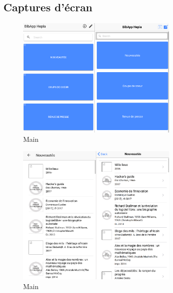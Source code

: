 \documentclass[a4paper, 12pt]{article}
\begin{document}
\subsection{Captures d'écran}
\begin{figure}
    \begin{center}
        \includegraphics[width=0.7\textwidth]{images/screenshots/android_iphone_1.png}
    \end{center}
    \caption{Main}
\end{figure}
\begin{figure}
    \begin{center}
        \includegraphics[width=0.7\textwidth]{images/screenshots/android_iphone_2.png}
    \end{center}
    \caption{Main}
\end{figure}
\end{document}

